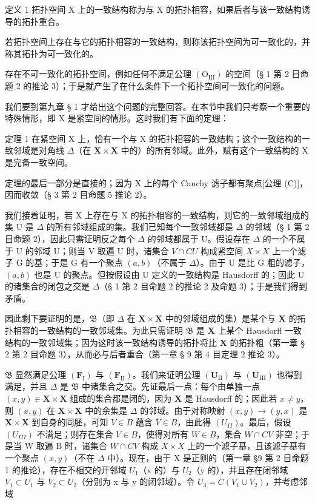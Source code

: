 定义 1 拓扑空间 X 上的一致结构称为与 X 的拓扑相容，如果后者与该一致结构诱导的拓扑重合。

若拓扑空间上存在与它的拓扑相容的一致结构，则称该拓扑空间为可一致化的，并称其拓扑为可一致化的。

存在不可一致化的拓扑空间，例如任何不满足公理 \((\mathrm{O}_{\mathrm{III}})\) 的空间（§ 1 第 2 目命题 2 的推论 3）；于是就产生了在什么条件下一个拓扑空间可一致化的问题。

我们要到第九章 § 1 才给出这个问题的完整回答。在本节中我们只考察一个重要的特殊情形，即 X 是紧空间的情形。这时我们有下面的定理：

定理 1 在紧空间 X 上，恰有一个与 X 的拓扑相容的一致结构；这个一致结构的一致邻域是对角线 \(\Delta\)（在 \(\mathbf{X} \times \mathbf{X}\) 中的）的所有邻域。此外，赋有这个一致结构的 X 是完备一致空间。

定理的最后一部分是直接的；因为 X 上的每个 Cauchy 滤子都有聚点{[}公理 (C){]}，因而收敛（§ 3 第 2 目命题 5 推论 2）。

我们接着证明，若 X 上存在与 X 的拓扑相容的一致结构，则它的一致邻域组成的集 U 是 \(\Delta\) 的所有邻域组成的集。我们已知每个一致邻域都是 \(\Delta\) 的邻域（§ 1 第 2 目命题 2），因此只需证明反之每个 \(\Delta\) 的邻域都属于 U。假设存在 \(\Delta\) 的一个不属于 U 的邻域 U；则当 V 取遍 U 时，诸集合 \(V \cap CU\) 构成紧空间 \(X \times X\) 上一个滤子 G 的基；于是 G 有一个聚点 \((a, b)\)（不属于 \(\Delta\)）。由于 U 是比 G 粗的滤子，\((a, b)\) 也是 U 的聚点。但按假设由 U 定义的一致结构是 Hausdorff 的；因此 U 的诸集合的闭包之交是 \(\Delta\)（§ 1 第 2 目命题 2 的推论 2 及命题 3）；于是我们得到矛盾。

因此剩下要证明的是，\(\mathfrak{B}\)（即 \(\Delta\) 在 \(\mathbf{X} \times \mathbf{X}\) 中的邻域组成的集）是某个与 \(\mathbf{X}\) 的拓扑相容的一致结构的一致邻域集。为此只需证明 \(\mathfrak{B}\) 是 \(\mathbf{X}\) 上某个 Hausdorff 一致结构的一致邻域集；因为这时该一致结构诱导的拓扑将比 \(\mathbf{X}\) 的拓扑粗（第一章 § 2 第 2 目命题 3），从而必与后者重合（第一章 § 9 第 4 目定理 2 推论 3）。

\(\mathfrak{B}\) 显然满足公理 \((\mathbf{F}_{\mathrm{I}})\) 与 \((\mathbf{F}_{\mathrm{II}})\)。我们来证明公理 \((\mathbf{U}_{\mathrm{II}})\) 与 \((\mathbf{U}_{\mathrm{III}})\) 也得到满足，并且 \(\Delta\) 是 \(\mathfrak{B}\) 中诸集合之交。先证最后一点：每个由单独一点 \((x, y) \in \mathbf{X} \times \mathbf{X}\) 组成的集合都是闭的，因为 \(\mathbf{X}\) 是 Hausdorff 的；因此若 \(x \neq y\)，则 \((x, y)\) 在 \(\mathbf{X} \times \mathbf{X}\) 中的余集是 \(\Delta\) 的邻域。由于对称映射 \((x, y) \to (y, x)\) 是 \(\mathbf{X} \times \mathbf{X}\) 到自身的同胚，可知 \(V \in B\) 蕴含 \(\overline{V} \in B\)，由此得 \((U_{II})\)。最后，假设 \((U_{III})\) 不满足；则存在集合 \(V \in B\)，使得对所有 \(W \in B\)，集合 \(\overline{W} \cap C V\) 非空；于是当 W 取遍 B 时，诸集合 \(\overline{W} \cap C V\) 构成 \(X \times X\) 上的一个滤子基，且该滤子基有一个聚点 \((x, y)\)（不在 \(\Delta\) 中）。现在，由于 X 是正则的（第一章 §9 第 2 目命题 1 的推论），存在不相交的开邻域 \(U_{1}\)（x 的）与 \(U_{2}\)（y 的），并且存在闭邻域 \(V_{1} \subset U_{1}\) 与 \(V_{2} \subset U_{2}\)（分别为 x 与 y 的闭邻域）。令 \(U_{3} = C(V_{1} \cup V_{2})\)，并考虑邻域

